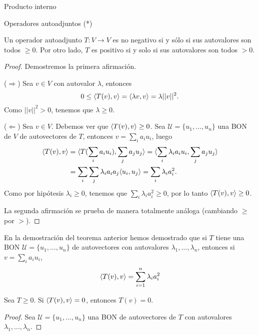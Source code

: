 \begin{chapter}{Producto interno}
\begin{section}{Operadores autoadjuntos (*)}
        \begin{teorema}
            Un operador autoadjunto $T: V \to V$  es no negativo si y sólo si sus autovalores son todos $\ge 0$. Por otro lado, $T$ es positivo  si y solo si sus autovalores son todos $> 0$.
        \end{teorema}
        \begin{proof}
            Demostremos la primera afirmación.
            
            ($\Rightarrow$) Sea $v \in V$ con autovalor $\lambda$, entonces
            $$
            0 \le \langle T(v),v \rangle = \langle \lambda v,v \rangle = \lambda ||v||^2.  
            $$
            Como $||v||^2 > 0$, tenemos que $\lambda \ge 0$.
            
            
            ($\Leftarrow$) Sea $v \in V$. Debemos ver que $ \langle T(v),v \rangle \ge 0$.  Sea $\mathcal{U} = \{u_1,\ldots,u_n\}$  una BON de $V$ de autovectores de $T$, entonces $v = \sum_i a_i u_i$, luego
            \begin{align*}
                \langle T(v),v \rangle  &=  \langle T(\sum_i a_i u_i),\sum_j a_j u_j \rangle =  \langle \sum_i \lambda_i a_i u_i,\sum_j a_j u_j \rangle \\ 
                &=  \sum_i\sum_j\lambda_i a_ia_j\langle  u_i,  u_j \rangle = \sum_i\lambda_i a_i^2.    
            \end{align*}
            Como por hipótesis $\lambda_i \ge 0$, tenemos que $\sum_i\lambda_i a_i^2\ge 0$, por lo tanto $ \langle T(v),v \rangle \ge 0$.
            
            La segunda afirmación se prueba de manera totalmente análoga (cambiando $\ge$ por $>$).
        \end{proof}
        
        \begin{observacion*}
            En la demostración del teorema anterior hemos demostrado  que si $T$ tiene una BON $\mathcal{U} = \{u_1,\ldots,u_n\}$ de autovectores con  autovalores $\lambda_1,\ldots,\lambda_n$, entonces si 
            $v = \sum_i a_i u_i$, 
            \begin{equation}\label{tvv}
            \langle T(v),v \rangle  =  \sum_{i=1}^n\lambda_i a_i^2
            \end{equation} 
        \end{observacion*}
        
        
        \begin{corolario}\label{coro1} 
         Sea $T \ge 0$. Si $\langle T(v), v \rangle = 0$, entonces $T(v)=0$.
        \end{corolario}
        \begin{proof}
            Sea $\mathcal{U} = \{u_1,\ldots,u_n\}$ una BON de autovectores de $T$  con  autovalores $\lambda_1,\ldots,\lambda_n$.
            

\end{proof}
\end{section}
\end{chapter}
